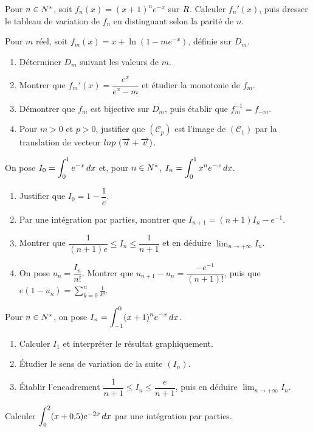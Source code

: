 \begin{annales}
Pour $n\in N^{*}$, soit $f_{n}(x) = (x+1)^{n}e^{-x}$ sur $R$. Calculer
$f_{n}'(x)$, puis dresser le tableau de variation de $f_{n}$ en distinguant
selon la parité de $n$.

Pour $m$ réel, soit $f_{m}(x) = x+\ln\!\left(1-me^{-x}\right)$, définie sur
$D_{m}$.
\begin{enumerate}[label=\textbf{\arabic*)}, leftmargin=*, itemsep=0.15em]
  \item Déterminer $D_{m}$ suivant les valeurs de $m$.
  \item Montrer que $f_{m}'(x) = \dfrac{e^{x}}{e^{x}-m}$ et étudier la
        monotonie de $f_{m}$.
  \item Démontrer que $f_{m}$ est bijective sur $D_{m}$, puis établir que
        $f_{m}^{-1} = f_{-m}$.
  \item Pour $m>0$ et $p>0$, justifier que $(\mathcal C_{p})$ est l'image de
        $(\mathcal C_{1})$ par la translation de vecteur
        $ln p\,\left(\overrightarrow{u}+\overrightarrow{v}\right)$.
\end{enumerate}

On pose $I_{0} = \displaystyle\int_{0}^{1}e^{-x}\,dx$ et, pour $n\in N^{*}$,
$I_{n} = \displaystyle\int_{0}^{1}x^{n}e^{-x}\,dx$.
\begin{enumerate}[label=\textbf{\arabic*)}, leftmargin=*, itemsep=0.15em]
  \item Justifier que $I_{0} = 1-\dfrac1e$.
  \item Par une intégration par parties, montrer que
        $I_{n+1} = (n+1)I_{n}-e^{-1}$.
  \item Montrer que $\dfrac{1}{(n+1)e} \leq I_{n} \leq \dfrac{1}{n+1}$ et en
        déduire $\lim_{n\to+\infty}I_{n}$.
  \item On pose $u_{n} = \dfrac{I_{n}}{n!}$. Montrer que
        $u_{n+1}-u_{n} = \dfrac{-e^{-1}}{(n+1)!}$, puis que
        $e\left(1-u_{n}\right) = \displaystyle\sum_{k=0}^{n}\frac{1}{k!}$.
\end{enumerate}

Pour $n\in N^{*}$, on pose
$I_{n} = \displaystyle\int_{-1}^{0}(x+1)^{n}e^{-x}\,dx$.
\begin{enumerate}[label=\textbf{\arabic*)}, leftmargin=*, itemsep=0.15em]
  \item Calculer $I_{1}$ et interpréter le résultat graphiquement.
  \item Étudier le sens de variation de la suite $(I_{n})$.
  \item Établir l'encadrement
        $\dfrac{1}{n+1} \leq I_{n} \leq \dfrac{e}{n+1}$, puis en déduire
        $\lim_{n\to+\infty}I_{n}$.
\end{enumerate}

Calculer $\displaystyle\int_{0}^{2}(x+0{,}5)e^{-2x}\,dx$ par une intégration
par parties.
\end{annales}

